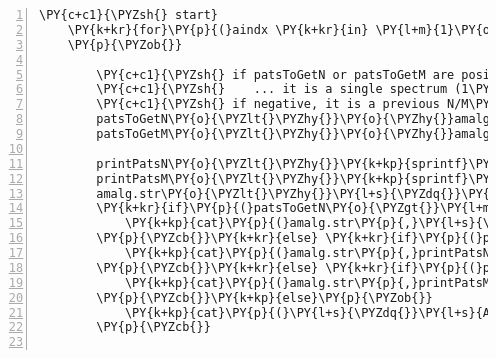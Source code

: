 \begin{Verbatim}[commandchars=\\\{\},codes={\catcode`\$=3\catcode`\^=7\catcode`\_=8},gobble=0,numbers=left,fontfamily=fvm,fontshape=n,fontsize=\footnotesize,tabsize=2]
	\PY{c+c1}{\PYZsh{} start}
	\PY{k+kr}{for}\PY{p}{(}aindx \PY{k+kr}{in} \PY{l+m}{1}\PY{o}{:}nAmal\PY{p}{)}
	\PY{p}{\PYZob{}}
	
		\PY{c+c1}{\PYZsh{} if patsToGetN or patsToGetM are positive,}
		\PY{c+c1}{\PYZsh{}    ... it is a single spectrum (1\PYZhy{}alignment)}
		\PY{c+c1}{\PYZsh{} if negative, it is a previous N/M\PYZhy{}alignment (N,M\PYZgt{}1) }
		patsToGetN\PY{o}{\PYZlt{}\PYZhy{}}\PY{o}{\PYZhy{}}amalg\PY{p}{[}aindx\PY{p}{,}\PY{l+m}{1}\PY{p}{]} 
		patsToGetM\PY{o}{\PYZlt{}\PYZhy{}}\PY{o}{\PYZhy{}}amalg\PY{p}{[}aindx\PY{p}{,}\PY{l+m}{2}\PY{p}{]}
		
		printPatsN\PY{o}{\PYZlt{}\PYZhy{}}\PY{k+kp}{sprintf}\PY{p}{(}\PY{l+s}{\PYZdq{}}\PY{l+s}{\PYZpc{}03d\PYZdq{}}\PY{p}{,}patsToGetN\PY{p}{)}
		printPatsM\PY{o}{\PYZlt{}\PYZhy{}}\PY{k+kp}{sprintf}\PY{p}{(}\PY{l+s}{\PYZdq{}}\PY{l+s}{\PYZpc{}03d\PYZdq{}}\PY{p}{,}patsToGetM\PY{p}{)}
		amalg.str\PY{o}{\PYZlt{}\PYZhy{}}\PY{l+s}{\PYZdq{}}\PY{l+s}{Amalgamting patient\PYZdq{}}
		\PY{k+kr}{if}\PY{p}{(}patsToGetN\PY{o}{\PYZgt{}}\PY{l+m}{0} \PY{o}{\PYZam{}\PYZam{}} patsToGetM\PY{o}{\PYZgt{}}\PY{l+m}{0}\PY{p}{)}\PY{p}{\PYZob{}}
			\PY{k+kp}{cat}\PY{p}{(}amalg.str\PY{p}{,}\PY{l+s}{\PYZdq{}}\PY{l+s}{s \PYZdq{}}\PY{p}{,}printPatsN\PY{p}{,}\PY{l+s}{\PYZdq{}}\PY{l+s}{ and \PYZdq{}}\PY{p}{,}printPatsM\PY{p}{,}\PY{l+s}{\PYZdq{}}\PY{l+s}{\PYZbs{}n\PYZdq{}}\PY{p}{,}sep\PY{o}{=}\PY{l+s}{\PYZdq{}}\PY{l+s}{\PYZdq{}}\PY{p}{)}
		\PY{p}{\PYZcb{}}\PY{k+kr}{else} \PY{k+kr}{if}\PY{p}{(}patsToGetN\PY{o}{\PYZgt{}}\PY{l+m}{0} \PY{o}{\PYZam{}\PYZam{}} patsToGetM\PY{o}{\PYZlt{}}\PY{l+m}{0}\PY{p}{)}\PY{p}{\PYZob{}} 
			\PY{k+kp}{cat}\PY{p}{(}amalg.str\PY{p}{,}printPatsN\PY{p}{,}\PY{l+s}{\PYZdq{}}\PY{l+s}{to previously amalgamated patients\PYZbs{}n\PYZdq{}}\PY{p}{)}
		\PY{p}{\PYZcb{}}\PY{k+kr}{else} \PY{k+kr}{if}\PY{p}{(}patsToGetN\PY{o}{\PYZlt{}}\PY{l+m}{0} \PY{o}{\PYZam{}\PYZam{}} patsToGetM\PY{o}{\PYZgt{}}\PY{l+m}{0}\PY{p}{)}\PY{p}{\PYZob{}} 
			\PY{k+kp}{cat}\PY{p}{(}amalg.str\PY{p}{,}printPatsM\PY{p}{,}\PY{l+s}{\PYZdq{}}\PY{l+s}{to previously amalgamated patients\PYZbs{}n\PYZdq{}}\PY{p}{)}
		\PY{p}{\PYZcb{}}\PY{k+kp}{else}\PY{p}{\PYZob{}} 
			\PY{k+kp}{cat}\PY{p}{(}\PY{l+s}{\PYZdq{}}\PY{l+s}{Amalgamting two clusters of previously amalgamated patients\PYZbs{}n\PYZdq{}}\PY{p}{)}
		\PY{p}{\PYZcb{}}
		

\end{Verbatim}
